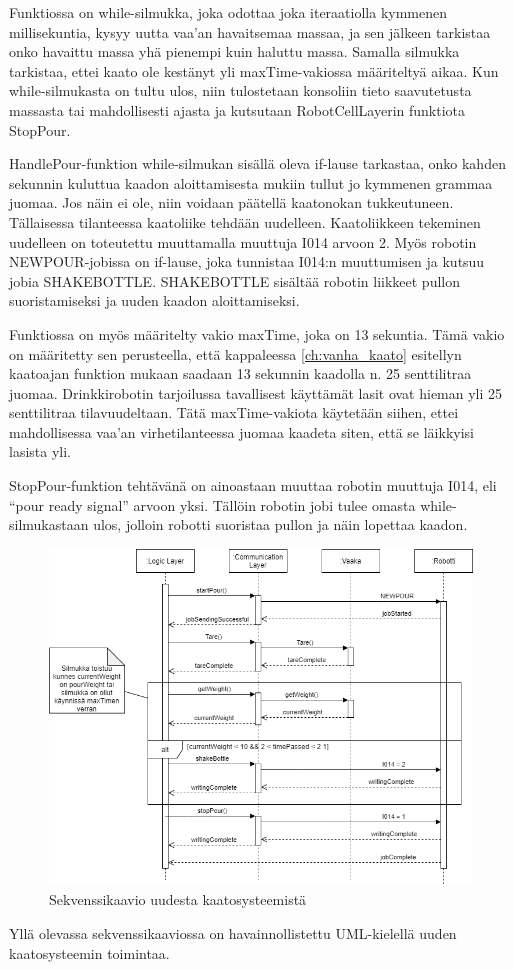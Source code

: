 Funktiossa on while-silmukka, joka odottaa joka iteraatiolla kymmenen millisekuntia, kysyy uutta vaa'an havaitsemaa massaa, ja sen jälkeen tarkistaa onko havaittu massa yhä pienempi kuin haluttu massa. Samalla silmukka tarkistaa, ettei kaato ole kestänyt yli maxTime-vakiossa määriteltyä aikaa. Kun while-silmukasta on tultu ulos, niin tulostetaan konsoliin tieto saavutetusta massasta tai mahdollisesti ajasta ja kutsutaan RobotCellLayerin funktiota StopPour.

HandlePour-funktion while-silmukan sisällä oleva if-lause tarkastaa, onko kahden sekunnin kuluttua kaadon aloittamisesta mukiin tullut jo kymmenen grammaa juomaa. Jos näin ei ole, niin voidaan päätellä kaatonokan tukkeutuneen. Tällaisessa tilanteessa kaatoliike tehdään uudelleen. Kaatoliikkeen tekeminen uudelleen on toteutettu muuttamalla muuttuja I014 arvoon 2. Myös robotin NEWPOUR-jobissa on if-lause, joka tunnistaa I014:n muuttumisen ja kutsuu jobia SHAKEBOTTLE. SHAKEBOTTLE sisältää robotin liikkeet pullon suoristamiseksi ja uuden kaadon aloittamiseksi.

Funktiossa on myös määritelty vakio maxTime, joka on 13 sekuntia. Tämä vakio on määritetty sen perusteella, että kappaleessa \ref{ch:vanha_kaato} esitellyn kaatoajan funktion mukaan saadaan 13 sekunnin kaadolla n. 25 senttilitraa juomaa. Drinkkirobotin tarjoilussa tavallisest käyttämät lasit ovat hieman yli 25 senttilitraa tilavuudeltaan. Tätä maxTime-vakiota käytetään siihen, ettei mahdollisessa vaa'an virhetilanteessa juomaa kaadeta siten, että se läikkyisi lasista yli.

StopPour-funktion tehtävänä on ainoastaan muuttaa robotin muuttuja I014, eli ``pour ready signal'' arvoon yksi. Tällöin robotin jobi tulee omasta while-silmukastaan ulos, jolloin robotti suoristaa pullon ja näin lopettaa kaadon.

\begin{figure}[!h]
\begin{center}
\includegraphics[scale=0.4]{img/Sequence_shakebottle.png}   %
\end{center}
\caption{Sekvenssikaavio uudesta kaatosysteemistä}
\label{fig:Sequence}
\end{figure}

Yllä olevassa sekvenssikaaviossa on havainnollistettu UML-kielellä uuden kaatosysteemin toimintaa.
